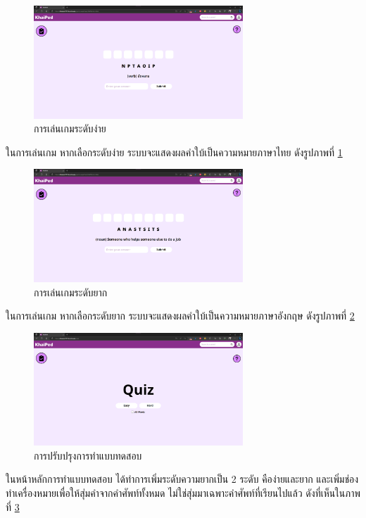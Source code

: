 \documentclass[12pt,oneside,openright,a4paper]{cpe-thai-project}
\begin{document}
\pagebreak
\begin{figure}[!h]\centering
	\includegraphics[width=0.7\textwidth, keepaspectratio=true]{image/chap4/Final/game easy.png}
	\caption{{การเล่นเกมระดับง่าย}}\label{fig:chap4FinGameEasy}
\end{figure}
\hspace{1cm}
ในการเล่นเกม หากเลือกระดับง่าย ระบบจะแสดงผลคำใบ้เป็นความหมายภาษาไทย
ดังรูปภาพที่ \ref{fig:chap4FinGameEasy}

\begin{figure}[!h]\centering
	\includegraphics[width=0.7\textwidth, keepaspectratio=true]{image/chap4/Final/game hard.png}
	\caption{{การเล่นเกมระดับยาก}}\label{fig:chap4FinGameHard}
\end{figure}
\hspace{1cm}
ในการเล่นเกม หากเลือกระดับยาก ระบบจะแสดงผลคำใบ้เป็นความหมายภาษาอังกฤษ
ดังรูปภาพที่ \ref{fig:chap4FinGameHard}

\pagebreak
\begin{figure}[!h]\centering
	\includegraphics[width=0.7\textwidth, keepaspectratio=true]{image/chap4/Final/quiz.png}
	\caption{{การปรับปรุงการทำแบบทดสอบ}}\label{fig:chap4FinQuiz}
\end{figure}
\hspace{1cm}
ในหน้าหลักการทำแบบทดสอบ ได้ทำการเพิ่มระดับความยากเป็น 2 ระดับ คือง่ายและยาก และเพิ่มช่องทำเครื่องหมายเพื่อให้สุ่มคำจากคำศัพท์ทั้งหมด
ไม่ใช่สุ่มมาเฉพาะคำศัพท์ที่เรียนไปแล้ว ดังที่เห็นในภาพที่ \ref{fig:chap4FinQuiz}
\end{document}
